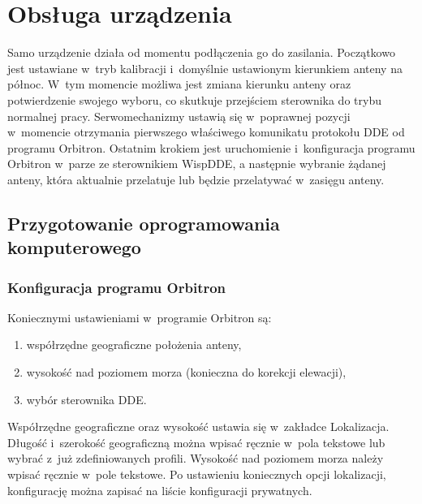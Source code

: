 \documentclass[eng,oneside]{mgr}
\begin{document}
	\chapter{Obsługa urządzenia}
	\label{sec:how_to_use_device}
	Samo urządzenie działa od momentu podłączenia go do zasilania. Początkowo jest ustawiane w~tryb kalibracji i~domyślnie ustawionym kierunkiem anteny na północ. W~tym momencie możliwa jest zmiana kierunku anteny oraz potwierdzenie swojego wyboru, co skutkuje przejściem sterownika do trybu normalnej pracy. Serwomechanizmy ustawią się w~poprawnej pozycji w~momencie otrzymania pierwszego właściwego komunikatu protokołu DDE od programu Orbitron. Ostatnim krokiem jest uruchomienie i~konfiguracja programu Orbitron w~parze ze sterownikiem WispDDE, a następnie wybranie żądanej anteny, która aktualnie przelatuje lub będzie przelatywać w~zasięgu anteny.

		\section{Przygotowanie oprogramowania komputerowego}
		
			\subsection{Konfiguracja programu Orbitron}
			Koniecznymi ustawieniami w~programie Orbitron są:
			\begin{enumerate}
				\item współrzędne geograficzne położenia anteny,
				\item wysokość nad poziomem morza (konieczna do korekcji elewacji),
				\item wybór sterownika DDE.
			\end{enumerate}

			Współrzędne geograficzne oraz wysokość ustawia się w~zakładce Lokalizacja. Długość i~szerokość geograficzną można wpisać ręcznie w~pola tekstowe lub wybrać z~już zdefiniowanych profili. Wysokość nad poziomem morza należy wpisać ręcznie w~pole tekstowe. Po ustawieniu koniecznych opcji lokalizacji, konfigurację można zapisać na liście konfiguracji prywatnych.
\end{document}
